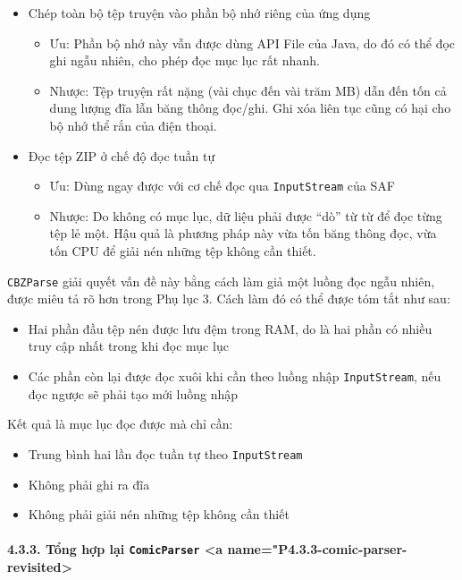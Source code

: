 \documentclass[
]{article}
\begin{document}
\begin{itemize}
\item
  Chép toàn bộ tệp truyện vào phần bộ nhớ riêng của ứng dụng

  \begin{itemize}
  \item
    Ưu: Phần bộ nhớ này vẫn được dùng API File của Java, do đó có thể
    đọc ghi ngẫu nhiên, cho phép đọc mục lục rất nhanh.
  \item
    Nhược: Tệp truyện rất nặng (vài chục đến vài trăm MB) dẫn đến tốn cả
    dung lượng đĩa lẫn băng thông đọc/ghi. Ghi xóa liên tục cũng có hại
    cho bộ nhớ thể rắn của điện thoại.
  \end{itemize}
\item
  Đọc tệp ZIP ở chế độ đọc tuần tự

  \begin{itemize}
    \item
    Ưu: Dùng ngay được với cơ chế đọc qua \texttt{InputStream} của SAF
  \item
    Nhược: Do không có mục lục, dữ liệu phải được ``dò'' từ từ để đọc
    từng tệp lẻ một. Hậu quả là phương pháp này vừa tốn băng thông đọc,
    vừa tốn CPU để giải nén những tệp không cần thiết.
  \end{itemize}
\end{itemize}

\texttt{CBZParse} giải quyết vấn đề này bằng cách làm giả một luồng đọc
ngẫu nhiên, được miêu tả rõ hơn trong Phụ lục 3. Cách làm đó có thể được
tóm tắt như sau:

\begin{itemize}
\item
  Hai phần đầu tệp nén được lưu đệm trong RAM, do là hai phần có nhiều
  truy cập nhất trong khi đọc mục lục
\item
  Các phần còn lại được đọc xuôi khi cần theo luồng nhập
  \texttt{InputStream}, nếu đọc ngược sẽ phải tạo mới luồng nhập
\end{itemize}

Kết quả là mục lục đọc được mà chỉ cần:

\begin{itemize}
\item
  Trung bình hai lần đọc tuần tự theo \texttt{InputStream}
\item
  Không phải ghi ra đĩa
\item
  Không phải giải nén những tệp không cần thiết
\end{itemize}

\hypertarget{tux1ed5ng-hux1ee3p-lux1ea1i-comicparser-a-namep4.3.3-comic-parser-revisited}{%
\paragraph{\texorpdfstring{4.3.3. Tổng hợp lại \texttt{ComicParser}
\textless a
name="P4.3.3-comic-parser-revisited\textgreater{}}{4.3.3. Tổng hợp lại ComicParser \textless a name="P4.3.3-comic-parser-revisited\textgreater{}}}\label{tux1ed5ng-hux1ee3p-lux1ea1i-comicparser-a-namep4.3.3-comic-parser-revisited}}
\end{document}
